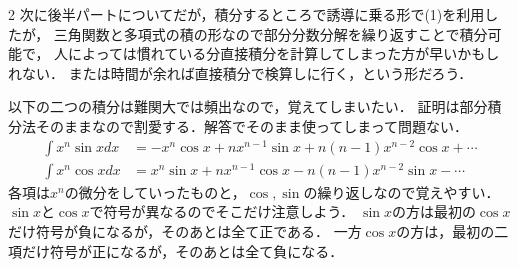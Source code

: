 \documentclass[../../main.tex]{subfiles}
\begin{document}
\begin{multicols}{2}
  次に後半パートについてだが，積分するところで誘導に乗る形で(1)を利用したが，
  三角関数と多項式の積の形なので部分分数分解を繰り返すことで積分可能で，
  人によっては慣れている分直接積分を計算してしまった方が早いかもしれない．
  または時間が余れば直接積分で検算しに行く，という形だろう．

  以下の二つの積分は難関大では頻出なので，覚えてしまいたい．
  証明は部分積分法そのままなので割愛する．解答でそのまま使ってしまって問題ない．
  \begin{align*}
    \int x^n\sin x dx & = - x^n \cos x + nx^{n-1} \sin x + n(n-1)x^{n-2}\cos x + \cdots \\
    \int x^n\cos x dx & =   x^n \sin x + nx^{n-1} \cos x - n(n-1)x^{n-2}\sin x - \cdots
  \end{align*}
  各項は$x^n$の微分をしていったものと，$\cos, \sin$の繰り返しなので覚えやすい．
  $\sin x$と$\cos x$で符号が異なるのでそこだけ注意しよう．
  $\sin x$の方は最初の$\cos x$だけ符号が負になるが，そのあとは全て正である．
  一方$\cos x$の方は，最初の二項だけ符号が正になるが，そのあとは全て負になる．


\end{multicols}
\end{document}
